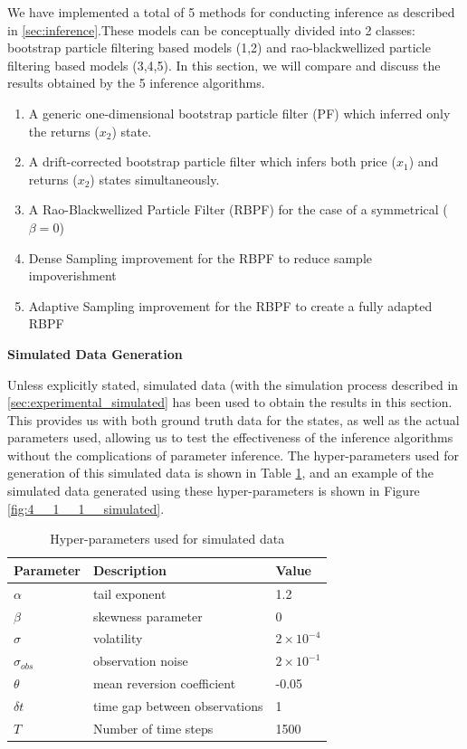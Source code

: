 \documentclass[../main.tex]{subfiles}
\begin{document}
	
We have implemented a total of 5 methods for conducting inference as described in \autoref{sec:inference}.These models can be conceptually divided into  2 classes: bootstrap particle filtering based models (1,2) and rao-blackwellized particle filtering based models (3,4,5). In this section, we will compare and discuss the results obtained by the 5 inference algorithms. 

\begin{enumerate}
	\item A generic one-dimensional bootstrap particle filter (PF) which inferred only the returns ($x_2$) state.
	\item A drift-corrected bootstrap particle filter which infers both price ($x_1$) and returns ($x_2$) states simultaneously. 
	\item A Rao-Blackwellized Particle Filter (RBPF) for the case of a symmetrical \asd ($\beta = 0$)
	\item Dense Sampling improvement for the RBPF to reduce sample impoverishment 
	\item Adaptive Sampling improvement for the RBPF to create a fully adapted RBPF 
\end{enumerate} 

\textbf{Simulated Data Generation}

Unless explicitly stated, simulated data (with the simulation process described in \autoref{sec:experimental_simulated} has been used to obtain the results in this section. This provides us with both ground truth data for the states, as well as the actual parameters used, allowing us to test the effectiveness of the inference algorithms without the complications of parameter inference. The hyper-parameters used for generation of this simulated data is shown in Table \ref{tab:4__1__1__simulated_hyperparams}, and an example of the simulated data generated using these hyper-parameters is shown in Figure \ref{fig:4__1__1__simulated}.

\begin{table}[h!]
	\centering
	\begin{tabular}{lll}
		\toprule
		Parameter & Description & Value \\
		\midrule
		$\alpha$	& \asd tail exponent 		& 1.2 	\\
		$\beta$		& \asd skewness parameter 	& 0 	\\
		$\sigma$	& \asd volatility 			& $2 \times 10^{-4}$ \\
		$\sigma_{obs}$ & observation noise		& $2 \times 10^{-1}$ \\
		$\theta$	& mean reversion coefficient & -0.05 \\
		$\delta t$  & time gap between observations & 1 \\
		$T$			& Number of time steps		& 1500 \\
		\bottomrule
	\end{tabular}
	\caption{Hyper-parameters used for simulated data}
	\label{tab:4__1__1__simulated_hyperparams}
\end{table}
\end{document}
